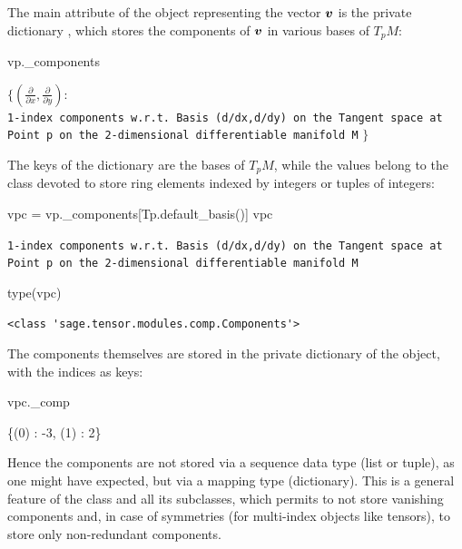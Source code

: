 The main attribute of the object  representing the vector $\bm{v}$ is the
private dictionary , which stores the components of $\bm{v}$ in various bases of $T_p M$:
\begin{NBin}
vp._components
\end{NBin}
\begin{NBout}
$\displaystyle
\bigg\{\left(\frac{\partial}{\partial x },\frac{\partial}{\partial y }\right) :$\\
\texttt{1-index components w.r.t.~Basis (d/dx,d/dy) on the Tangent space at Point p on the 2-dimensional differentiable manifold M}
$\bigg\}$
\end{NBout}
The keys of the dictionary  are the bases of $T_p M$, while the values belong to the class  devoted to store ring elements indexed by integers or tuples of integers:
\begin{NBin}
vpc = vp._components[Tp.default_basis()]
vpc
\end{NBin}
\begin{NBout}
\texttt{1-index components w.r.t.~Basis (d/dx,d/dy) on the Tangent space at Point p
on the 2-dimensional differentiable manifold M}
\end{NBout}
\vspace*{-\baselineskip}
\begin{NBin}
type(vpc)
\end{NBin}
\begin{NBout}
\begin{verbatim}
<class 'sage.tensor.modules.comp.Components'>
\end{verbatim}
\end{NBout}
The components themselves are stored in the private dictionary  of the  object, with the indices as keys:
\begin{NBin}
vpc._comp
\end{NBin}
\begin{NBoutM}
\left\{\left(0\right) : -3, \left(1\right) : 2\right\}
\end{NBoutM}
Hence the components are not stored via a sequence data type (list or tuple), as
one might have expected, but via a mapping type (dictionary). This is a general
feature of the class  and all its subclasses, which permits
to not store vanishing components and, in case of symmetries (for multi-index
objects like tensors), to store only non-redundant components.

